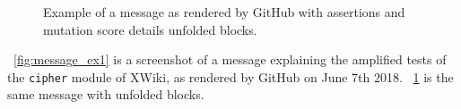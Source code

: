 \documentclass[a4paper,11pt]{sdm_internship}
\theoremstyle{definition}
\begin{document}
\begin{appendices}
\begin{figure}[H]
  \centering
  \caption{Example of a message as rendered by GitHub with assertions and mutation score details unfolded blocks.}%
  \label{fig:message_ex1_unfolded}
\end{figure}

\figurename~\ref{fig:message_ex1} is a screenshot of a message explaining the amplified tests of the \texttt{cipher} module of XWiki, as rendered by GitHub on June 7th 2018.
\figurename~\ref{fig:message_ex1_unfolded} is the same message with unfolded blocks.


\end{appendices}
\end{document}
